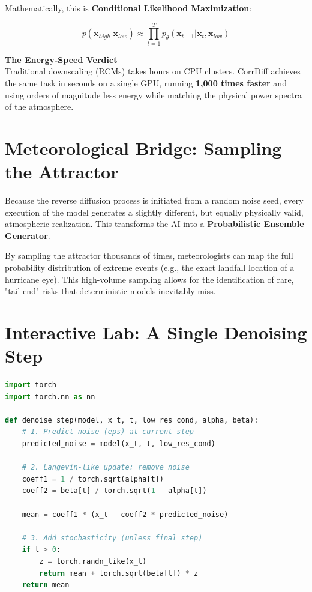 Mathematically, this is \textbf{Conditional Likelihood Maximization}:

\begin{equation}
p(\mathbf{x}_{high} | \mathbf{x}_{low}) \approx \prod_{t=1}^{T} p_\theta(\mathbf{x}_{t-1} | \mathbf{x}_t, \mathbf{x}_{low})
\end{equation}

\begin{infobox}
\textbf{The Energy-Speed Verdict}\\
Traditional downscaling (RCMs) takes hours on CPU clusters. CorrDiff achieves the same task in seconds on a single GPU, running \textbf{1,000 times faster} and using orders of magnitude less energy while matching the physical power spectra of the atmosphere.
\end{infobox}

\section{Meteorological Bridge: Sampling the Attractor}

Because the reverse diffusion process is initiated from a random noise seed, every execution of the model generates a slightly different, but equally physically valid, atmospheric realization. This transforms the AI into a \textbf{Probabilistic Ensemble Generator}. 

By sampling the attractor thousands of times, meteorologists can map the full probability distribution of extreme events (e.g., the exact landfall location of a hurricane eye). This high-volume sampling allows for the identification of rare, "tail-end" risks that deterministic models inevitably miss.

\section{Interactive Lab: A Single Denoising Step}

\begin{lstlisting}[language=Python, caption=Python Implementation of Reverse Diffusion Step]
import torch
import torch.nn as nn

def denoise_step(model, x_t, t, low_res_cond, alpha, beta):
    # 1. Predict noise (eps) at current step
    predicted_noise = model(x_t, t, low_res_cond)
    
    # 2. Langevin-like update: remove noise
    coeff1 = 1 / torch.sqrt(alpha[t])
    coeff2 = beta[t] / torch.sqrt(1 - alpha[t])
    
    mean = coeff1 * (x_t - coeff2 * predicted_noise)
    
    # 3. Add stochasticity (unless final step)
    if t > 0:
        z = torch.randn_like(x_t)
        return mean + torch.sqrt(beta[t]) * z
    return mean
\end{lstlisting}

